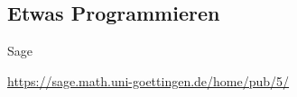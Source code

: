 \documentclass[notes=hide,hyperref={dvipdfmx,pdfpagelabels=false}]{beamer}
\begin{document}
\subsection{Etwas Programmieren}
\begin{frame}[fragile]{Sage}
\begin{center}
\url{https://sage.math.uni-goettingen.de/home/pub/5/}
\end{center}
\end{frame}
%
%
\end{document}
